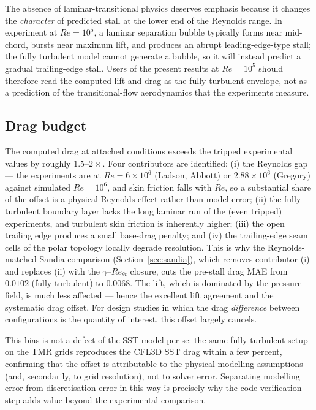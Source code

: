 \documentclass[11pt,a4paper]{article}
\begin{document}
The absence of laminar-transitional physics deserves emphasis because it changes the \emph{character} of predicted stall at the lower end of the Reynolds range. In experiment at $Re = 10^5$, a laminar separation bubble typically forms near mid-chord, bursts near maximum lift, and produces an abrupt leading-edge-type stall; the fully turbulent model cannot generate a bubble, so it will instead predict a gradual trailing-edge stall. Users of the present results at $Re = 10^5$ should therefore read the computed lift and drag as the fully-turbulent envelope, not as a prediction of the transitional-flow aerodynamics that the experiments measure.

\subsection{Drag budget}\label{sec:dragbudget}
The computed drag at attached conditions exceeds the tripped experimental values by roughly $1.5$--$2\times$. Four contributors are identified: (i) the Reynolds gap --- the experiments are at $Re = 6\times10^6$ (Ladson, Abbott) or $2.88\times10^6$ (Gregory) against simulated $Re = 10^6$, and skin friction falls with $Re$, so a substantial share of the offset is a physical Reynolds effect rather than model error; (ii) the fully turbulent boundary layer lacks the long laminar run of the (even tripped) experiments, and turbulent skin friction is inherently higher; (iii) the open trailing edge produces a small base-drag penalty; and (iv) the trailing-edge seam cells of the polar topology locally degrade resolution. This is why the Reynolds-matched Sandia comparison (Section~\ref{sec:sandia}), which removes contributor (i) and replaces (ii) with the $\gamma$--$Re_{\theta t}$ closure, cuts the pre-stall drag MAE from $0.0102$ (fully turbulent) to $0.0068$. The lift, which is dominated by the pressure field, is much less affected --- hence the excellent lift agreement and the systematic drag offset. For design studies in which the drag \emph{difference} between configurations is the quantity of interest, this offset largely cancels.

This bias is not a defect of the SST model per se: the same fully turbulent setup on the TMR grids reproduces the CFL3D SST drag within a few percent, confirming that the offset is attributable to the physical modelling assumptions (and, secondarily, to grid resolution), not to solver error. Separating modelling error from discretisation error in this way is precisely why the code-verification step adds value beyond the experimental comparison.
\end{document}
